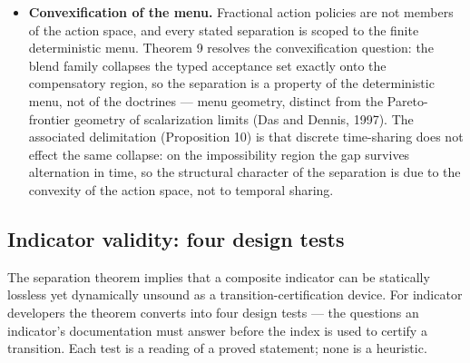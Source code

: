 \documentclass[3p,11pt]{elsarticle}
\begin{document}
\begin{itemize}
\item
  \textbf{Convexification of the menu.} Fractional action policies are
  not members of the action space, and every stated separation is scoped
  to the finite deterministic menu. Theorem 9 resolves the convexification question: the blend family collapses the typed acceptance set exactly onto the compensatory
  region, so the separation is a property of the deterministic menu, not
  of the doctrines --- menu geometry, distinct from the Pareto-frontier
  geometry of scalarization limits (Das and Dennis, 1997). The
  associated delimitation (Proposition 10) is that discrete time-sharing
  does not effect the same collapse: on the impossibility region the gap
  survives alternation in time, so the structural character of the separation is due to the convexity of the action space, not to temporal sharing.
\end{itemize}

\subsection{Indicator validity: four design tests}\label{indicator-validity}

The separation theorem implies that a composite indicator can be
statically lossless yet dynamically unsound as a
transition-certification device. For indicator developers the theorem
converts into four design tests --- the questions an indicator's
documentation must answer before the index is used to certify a
transition. Each test is a reading of a proved statement; none is a
heuristic.
\end{document}
